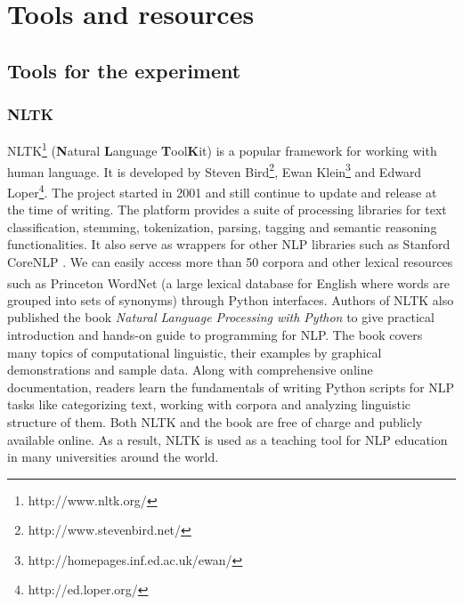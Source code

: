 
\chapter{Tools and resources}
	\label{chapter:empire-strikes-back}%



\section{Tools for the experiment}
\subsection*{NLTK}
NLTK\footnote{http://www.nltk.org/} (\textbf{N}atural \textbf{L}anguage \textbf{T}ool\textbf{K}it) is a popular framework for working with human language. It is developed by Steven Bird\footnote{http://www.stevenbird.net/}, Ewan Klein\footnote{http://homepages.inf.ed.ac.uk/ewan/} and Edward Loper\footnote{http://ed.loper.org/}. The project started in 2001 and still continue to update and release at the time of writing. The platform provides a suite of processing libraries for text classification, stemming, tokenization, parsing, tagging and semantic reasoning functionalities. It also serve as wrappers for other NLP libraries such as Stanford CoreNLP \cite{manning-EtAl:2014:P14-5}. We can easily access more than 50 corpora and other lexical resources such as Princeton WordNet\textsuperscript{\textregistered} (a large lexical database for English where words are grouped into sets of synonyms\cite{Fellbaum1998}) through Python interfaces. Authors of NLTK also published the book \textit{Natural Language Processing with Python} \cite{Bird2009} to give practical introduction and hands-on guide to programming for NLP. The book covers many topics of computational linguistic, their examples by graphical demonstrations and sample data. Along with comprehensive online documentation, readers learn the fundamentals of writing Python scripts for NLP tasks like categorizing text, working with corpora and analyzing linguistic structure of them. Both NLTK and the book are free of charge and publicly available online. As a result, NLTK is used as a teaching tool for NLP education in many universities around the world.  

